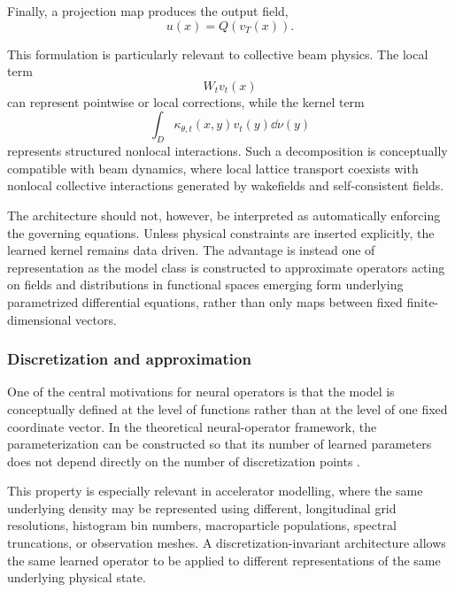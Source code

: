 Finally, a projection map produces the output field,
\begin{equation}
u(x)
=
Q(v_T(x)).
\label{eq:NO_project}
\end{equation}

This formulation is particularly relevant to collective beam physics. The local term
\begin{equation}
W_t v_t(x)
\end{equation}
can represent pointwise or local corrections, while the kernel term
\begin{equation}
\int_D
\kappa_{\theta,t}(x,y)
v_t(y)
\dd\nu(y)
\end{equation}
represents structured nonlocal interactions. Such a decomposition is conceptually compatible with beam dynamics, where local lattice transport coexists with nonlocal collective interactions generated by wakefields and self-consistent fields.

The architecture should not, however, be interpreted as automatically enforcing the governing equations. Unless physical constraints are inserted explicitly, the learned kernel remains data driven. The advantage is instead one of representation as the model class is constructed to approximate operators acting on fields and distributions in functional spaces emerging form underlying parametrized differential equations, rather than only maps between fixed finite-dimensional vectors.

\subsubsection{Discretization and approximation}
\label{subsubsec:NO_discretization}

One of the central motivations for neural operators is that the model is conceptually defined at the level of functions rather than at the level of one fixed coordinate vector. In the theoretical neural-operator framework, the parameterization can be constructed so that its number of learned parameters does not depend directly on the number of discretization points \cite{kovachki_neural_2023}.

This property is especially relevant in accelerator modelling, where the same underlying density may be represented using different, longitudinal grid resolutions, histogram bin numbers, macroparticle populations, spectral truncations, or observation meshes. A discretization-invariant architecture allows the same learned operator to be applied to different representations of the same underlying physical state.

